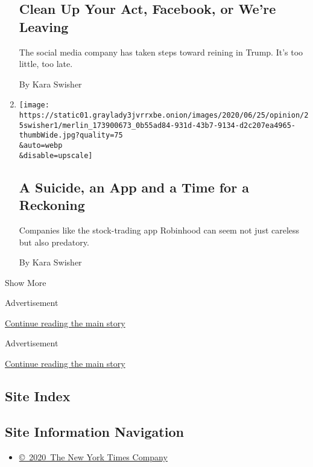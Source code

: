 \begin{enumerate}
  \hypertarget{clean-up-your-act-facebook-or-were-leaving}{%
  \subsection{Clean Up Your Act, Facebook, or We're
  Leaving}\label{clean-up-your-act-facebook-or-were-leaving}}

  The social media company has taken steps toward reining in Trump. It's
  too little, too late.

  By Kara Swisher
\item
  \href{/2020/06/25/opinion/robinhood-suicide-trading.html}{}

  \texttt{[image: https://static01.graylady3jvrrxbe.onion/images/2020/06/25/opinion/25swisher1/merlin\_173900673\_0b55ad84-931d-43b7-9134-d2c207ea4965-thumbWide.jpg?quality=75\\\&auto=webp\\\&disable=upscale]}

  \hypertarget{a-suicide-an-app-and-a-time-for-a-reckoning}{%
  \subsection{A Suicide, an App and a Time for a
  Reckoning}\label{a-suicide-an-app-and-a-time-for-a-reckoning}}

  Companies like the stock-trading app Robinhood can seem not just
  careless but also predatory.

  By Kara Swisher
\end{enumerate}

Show More

Advertisement

\protect\hyperlink{after-mid1}{Continue reading the main story}

Advertisement

\protect\hyperlink{after-mktg}{Continue reading the main story}

\hypertarget{site-index}{%
\subsection{Site Index}\label{site-index}}

\hypertarget{site-information-navigation}{%
\subsection{Site Information
Navigation}\label{site-information-navigation}}

\begin{itemize}
\tightlist
\item
  \href{https://help.nytimes3xbfgragh.onion/hc/en-us/articles/115014792127-Copyright-notice}{©~2020~The
  New York Times Company}
\end{itemize}

